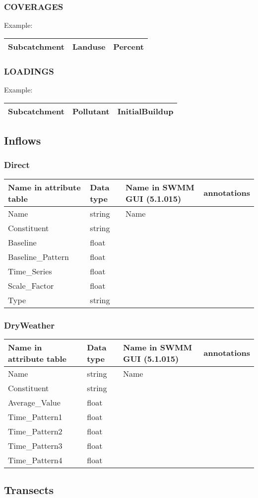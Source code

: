 \documentclass[10pt,a4paper,oneside]{scrbook}
\begin{document}
\subsubsection{COVERAGES}
Example:\\
\begin{tabular}{|p{5cm}|p{2cm}|P{3cm}|}
\hline 
\textbf{Subcatchment} & \textbf{Landuse} & \textbf{Percent}\\ 
\hline
\end{tabular}
\subsubsection{LOADINGS}
Example:\\
\begin{tabular}{|p{5cm}|p{2cm}|P{3cm}|}
\hline 
\textbf{Subcatchment} & \textbf{Pollutant} & \textbf{InitialBuildup}\\ 
\hline
\end{tabular}

\subsection{Inflows}
\subsubsection{Direct}
\begin{tabular}{p{4cm}|p{1.3cm}|P{3cm}|P{5.7cm}}
\hline 
\textbf{Name in attribute table} & \textbf{Data type} & \textbf{Name in SWMM GUI (5.1.015)} & \textbf{annotations}\\ 
\hline 
Name & string & Name & \\
Constituent & string &  & \\ 
Baseline & float &  & \\ 
Baseline\_Pattern & float &  & \\ 
Time\_Series & float &  & \\ 
Scale\_Factor & float &  & \\ 
Type & string &  & \\ 
\hline
\end{tabular}

\subsubsection{Dry\textunderscore Weather}
\begin{tabular}{p{4cm}|p{1.3cm}|P{3cm}|P{5.7cm}}
\hline 
\textbf{Name in attribute table} & \textbf{Data type} & \textbf{Name in SWMM GUI (5.1.015)} & \textbf{annotations}\\ 
\hline 
Name & string & Name & \\
Constituent & string &  & \\ 
Average\_Value & float &  & \\ 
Time\_Pattern1 & float &  & \\  
Time\_Pattern2 & float &  & \\ 
Time\_Pattern3 & float &  & \\ 
Time\_Pattern4 & float &  & \\ 
\hline
\end{tabular}


\subsection{Transects}
\end{document}
